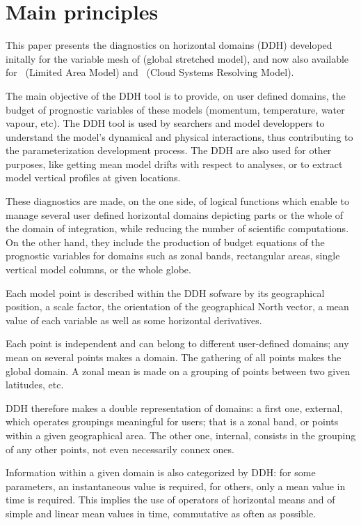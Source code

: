 \chapter{Main principles}

\null
\vspace{1cm}
 
This paper presents the diagnostics on horizontal domains (DDH) developed initally for
the variable mesh of \ARP (global stretched model), and now also available for
\ALA\ (Limited Area Model) and \ARO\ (Cloud Systems Resolving Model).

The main objective of the DDH tool is to provide, on user defined domains, the budget
of prognostic variables of these models (momentum, temperature, water vapour,
etc). The DDH tool is used by searchers and model developpers to understand the
model's dynamical and physical interactions, thus contributing to the
parameterization development process. The DDH are also
used for other purposes, like getting mean model drifts with respect to analyses,
or to extract model vertical profiles at given locations.

These diagnostics are made, on the one side, of logical functions which enable
to manage several user defined horizontal domains depicting parts or the whole
of the domain of integration, while reducing the number of scientific
computations. On the other hand, they include the production of budget equations
of the prognostic variables for domains such as zonal bands, rectangular areas, single
vertical model columns, or the whole globe.

Each model point is described within the DDH sofware by its geographical
position, a scale factor, the orientation of the geographical North vector, a
mean value of each variable as well as some horizontal derivatives.

Each point is independent and can belong to different user-defined domains; any
mean on several points makes a domain. The gathering of all points makes the
global domain. A zonal mean is made on a grouping of points between two given
latitudes, etc.

DDH therefore makes a double representation of domains: a first one, external,
which operates groupings meaningful for users; that is a zonal band, or points
within a given geographical area. The other one, internal, consists in the
grouping of any other points, not even necessarily connex ones.

Information within a given domain is also categorized by DDH: for some
parameters, an instantaneous value is required, for others, only a mean value in
time is required. This implies the use of operators of horizontal means and of
simple and linear mean values in time, commutative as often as possible.

